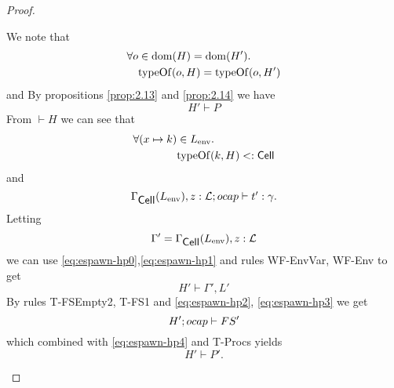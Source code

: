 \begin{proof}
\begin{description}
      We note that
      \begin{equation} \label{eq:espawn-hp0}
        \begin{aligned}
          \forall o &\in \mbox{$\mathrm{dom}$}(H) = \mbox{$\mathrm{dom}$}(H'). \\
            &\mbox{$\mathrm{typeOf}$}(o, H) = \mbox{$\mathrm{typeOf}$}(o, H')
        \end{aligned}
      \end{equation}
      and 
      By propositions \ref{prop:2.13} and \ref{prop:2.14} we have
      \begin{equation} \label{eq:espawn-hp4}
        H' \vdash P
      \end{equation}
      From $\vdash H$ we can see that
      \begin{equation} \label{eq:espawn-hp1}
        \begin{aligned}
          \forall (x \mapsto k) &\in L_{\text{env}}. \\
            &\mbox{$\mathrm{typeOf}$}(k, H) <: \mbox{$\mathsf{Cell}$}
        \end{aligned}
      \end{equation}
      and
      \begin{equation} \label{eq:espawn-hp2}
        \mbox{$\Gamma_{\mbox{$\mathsf{Cell}$}}(L_{\text{env}}), z:
        \mbox{$\mathcal{L}$};\mbox{$ocap$}\vdash t':\gamma$}.
      \end{equation}
      Letting
      \begin{equation}
        \Gamma' = \Gamma_{\mbox{$\mathsf{Cell}$}}(L_{\text{env}}), z: \mbox{$\mathcal{L}$}
      \end{equation}
      we can use \eqref{eq:espawn-hp0},\eqref{eq:espawn-hp1} and rules {\sc
      WF-EnvVar, WF-Env} to get
      \begin{equation} \label{eq:espawn-hp3}
        H' \vdash \Gamma', L'
      \end{equation}
      By rules {\sc T-FSEmpty2, T-FS1} and \eqref{eq:espawn-hp2},
      \eqref{eq:espawn-hp3} we get
      \begin{equation}
        H'; \mbox{$ocap$} \vdash FS'
      \end{equation}
      which combined with \eqref{eq:espawn-hp4} and {\sc T-Procs} yields
      \begin{equation}
        H' \vdash P'.
      \end{equation}
      


\end{description}
\end{proof}
